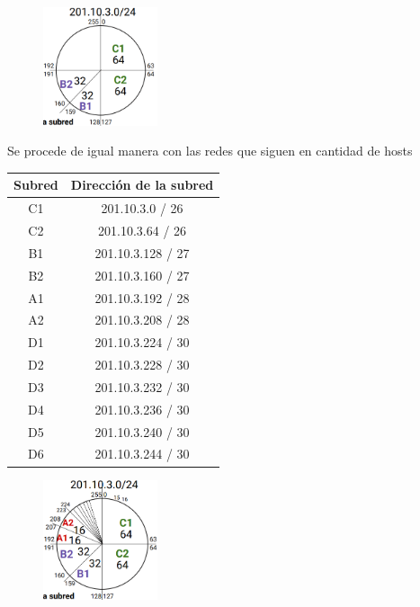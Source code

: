 \begin{figure}[H]
\centering
\includegraphics[width=0.3\textwidth]{imagenes/subnetting16.png}
\end{figure}

Se procede de igual manera con las redes que siguen en cantidad de hosts


\begin{center}
    \begin{tabular}{c|c}
    Subred & Dirección de la subred \\
    \hline
    \hline
    C1     & 201.10.3.0 / 26 \\
    \hline
    C2     & 201.10.3.64 / 26 \\
    \hline
    B1     & 201.10.3.128 / 27 \\
    \hline
    B2     & 201.10.3.160 / 27 \\
    \hline
    A1     & 201.10.3.192 / 28 \\
    \hline
    A2     & 201.10.3.208 / 28 \\
    \hline
    D1     & 201.10.3.224 / 30\\
    \hline
    D2     & 201.10.3.228 / 30 \\
    \hline
    D3     & 201.10.3.232 / 30 \\
    \hline
    D4     & 201.10.3.236 / 30\\
    \hline
    D5     & 201.10.3.240 / 30 \\
    \hline
    D6     & 201.10.3.244 / 30 \\
    \end{tabular}
\end{center}


\begin{figure}[H]
\centering
\includegraphics[width=0.3\textwidth]{imagenes/subnetting17.png}
\end{figure}


